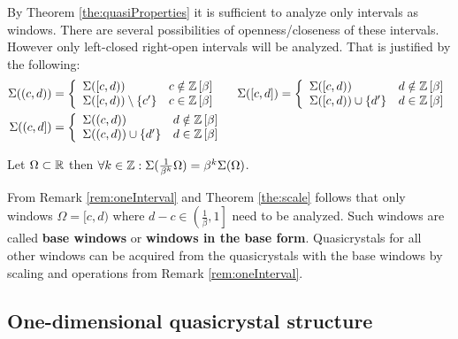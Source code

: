 \documentclass[text.tex]{subfiles}
\begin{document}
\begin{remark} %
\label{rem:oneInterval}
By Theorem \ref{the:quasiProperties} it is sufficient to analyze only intervals as windows. There are several possibilities of openness/closeness of these intervals. However only left-closed right-open intervals will be analyzed. That is justified by the following:
\begin{align*}
\Sigma((c,d)) &= \left\{ 
	\begin{array}{l l}
	\Sigma([c,d)) & c \notin \mathbb{Z}\left[\beta\right]\\
	\Sigma([c,d))\setminus\{c'\} & c \in \mathbb{Z}\left[\beta\right]
	\end{array} \right. &
  \Sigma([c,d]) &= \left\{ 
	\begin{array}{l l}
	\Sigma([c,d)) & d \notin \mathbb{Z}\left[\beta\right]\\
	\Sigma([c,d))\cup\{d'\} & d \in \mathbb{Z}\left[\beta\right]
	\end{array} \right.
  \\
\Sigma((c,d]) &= \left\{ 
	\begin{array}{l l}
	\Sigma((c,d)) & d \notin \mathbb{Z}\left[\beta\right]\\
	\Sigma((c,d))\cup\{d'\} & d \in \mathbb{Z}\left[\beta\right]
	\end{array} \right.\\
\end{align*}
\end{remark}

\begin{theorem}
\label{the:scale}
Let $\Omega \subset \mathbb{R}$ then $\forall k\in \mathbb{Z}: \Sigma(\frac{1}{\beta^k}\Omega) = \beta^k\Sigma(\Omega)$.
\end{theorem}

\begin{corollary}
\label{cor:baseInterval}
From Remark \ref{rem:oneInterval} and Theorem \ref{the:scale} follows that only windows $\Omega = [c,d)$ where $d-c\in\left( \frac{1}{\beta}, 1 \right]$ need to be analyzed. Such windows are called \textbf{base windows} or \textbf{windows in the base form}. Quasicrystals for all other windows can be acquired from the quasicrystals with the base windows by scaling and operations from Remark \ref{rem:oneInterval}.
\end{corollary}

\subsection{One-dimensional quasicrystal structure}%
\end{document}
